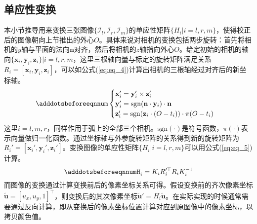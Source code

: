 \subsection{单应性变换}
本小节推导用来变换三张图像$\{\mathcal{I}_l, \mathcal{I}_r, \mathcal{I}_m\}$的单应性矩阵$\{\mathit{H}_i|i=l, r, m\}$，使得校正后的图像朝向上节推出的外心$O$。具体来说对相机的变换包括两步旋转：首先将相机的$y$轴与平面的法向$\mathbf{n}$对齐，然后将相机的$z$轴指向外心$O$。给定初始的相机的轴向$\{\mathbf{x}_i, \mathbf{y}_i, \mathbf{z}_i\} | i=l, r, m$，这里三根轴向量与标定的旋转矩阵满足关系$R_i = [\mathbf{x}_i, \mathbf{y}_i, \mathbf{z}_i]$，可以如公式(\ref{eq:eq_4})计算出相机的三根轴经过对齐后的新坐标轴。
\begin{equation} \label{eq:eq_4}
    \adddotsbeforeeqnnum%
    \begin{cases}
        \mathbf{x}_i' = \mathbf{y}_i' \times \mathbf{z}_i'\\
        \mathbf{y}_i' = \mathrm{sgn}(\mathbf{n} \cdot \mathbf{y}_i) \cdot \mathbf{n}\\
        \mathbf{z}_i' = \mathrm{sgn}(\mathbf{z}_i \cdot ({O} - t_i)) \cdot \pi(O - t_i)
    \end{cases}
\end{equation}
这里$i = l, m, r$，同样作用于弧上的全部三个相机。$\mathrm{sgn}(\cdot)$是符号函数，$\pi(\cdot)$表示向量做归一化函数。通过坐标轴与外参旋转矩阵的关系得到新的旋转矩阵为$R_i' = [\mathbf{x}_i', \mathbf{y}_i', \mathbf{z}_i']$。变换图像的单应性矩阵$\{H_i | i=l, r, m\}$可以用公式(\ref{eq:eq_5})计算。
\begin{equation}\label{eq:eq_5}
    \adddotsbeforeeqnnum%
    H_i = K_iR_i'^{\top}R_iK_i^{-1}
\end{equation}
而图像的变换通过计算变换前后的像素坐标关系可得。假设变换前的齐次像素坐标$\tilde{\mathbf{u}}=[u_x, u_y, 1]^{\top}$，则变换后的其次像素坐标$\tilde{\mathbf{u}}'=H_i \tilde{\mathbf{u}}$。在实际实现的时候通常需要通过反向计算，即从变换后的像素坐标位置计算对应到原图像中的像素坐标，以拷贝颜色值。


